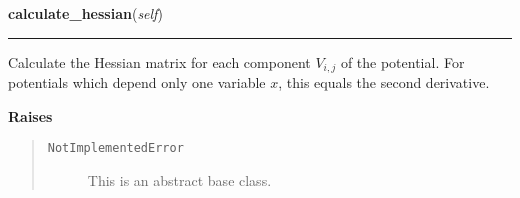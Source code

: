     \vspace{0.5ex}

\hspace{.8\funcindent}\begin{boxedminipage}{\funcwidth}

    \raggedright \textbf{calculate\_hessian}(\textit{self})

    \vspace{-1.5ex}

    \rule{\textwidth}{0.5\fboxrule}
\setlength{\parskip}{2ex}
    Calculate the Hessian matrix for each component $V_{i,j}$ of the
    potential. For potentials which depend only one variable $x$, this
    equals the second derivative.

\setlength{\parskip}{1ex}
      \textbf{Raises}
    \vspace{-1ex}

      \begin{quote}
        \begin{description}

          \item[\texttt{NotImplementedError}]

          This is an abstract base class.

        \end{description}

      \end{quote}

    \end{boxedminipage}

    \label{MatrixPotential:MatrixPotential:evaluate_hessian_at}

    \vspace{0.5ex}

